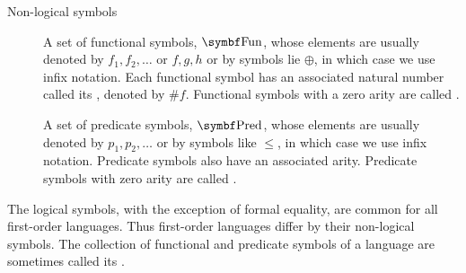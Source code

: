 \begin{definition}
\begin{description}
    \item[Non-logical symbols]\mbox{}
    \begin{DefEnum}[resume=def:first_order_logic_alphabet]
       A set of functional symbols, \( \Bold{Fun} \), whose elements are usually denoted by \( f_1, f_2, \ldots \) or \( f, g, h \) or by symbols lie \( \oplus \), in which case we use infix notation. Each functional symbol has an associated natural number called its , denoted by \( \# f \). Functional symbols with a zero arity are called .

       A set of predicate symbols, \( \Bold{Pred} \), whose elements are usually denoted by \( p_1, p_2, \ldots \) or by symbols like \( \leq \), in which case we use infix notation. Predicate symbols also have an associated arity. Predicate symbols with zero arity are called .
    \end{DefEnum}
  \end{description}

  The logical symbols, with the exception of formal equality, are common for all first-order languages. Thus first-order languages differ by their non-logical symbols. The collection of functional and predicate symbols of a language are sometimes called its .
\end{definition}

